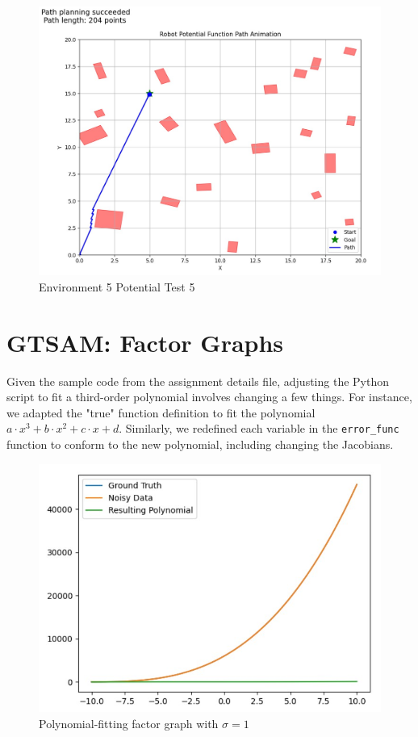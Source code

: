 \documentclass{article}
\begin{document}
\begin{figure} [H]
    \centering
    \includegraphics[width=0.5\linewidth]{latex_media/Env5PotentialTest5.jpg}
    \caption{Environment 5 Potential Test 5}
\end{figure}

\section{GTSAM: Factor Graphs}
Given the sample code from the assignment details file, adjusting the Python script to fit a third-order polynomial involves changing a few things. For instance, we adapted the "true" function definition to fit the polynomial $a\cdot x^3 + b\cdot x^2 + c\cdot x + d$. Similarly, we redefined each variable in the \texttt{error\_func} function to conform to the new polynomial, including changing the Jacobians.

\begin{figure} [H]
    \centering
    \includegraphics[width=0.8\linewidth]{latex_media/polynomial_factor_graph_sigma1.jpg}
    \caption{Polynomial-fitting factor graph with $\sigma = 1$}
\end{figure}
\end{document}
